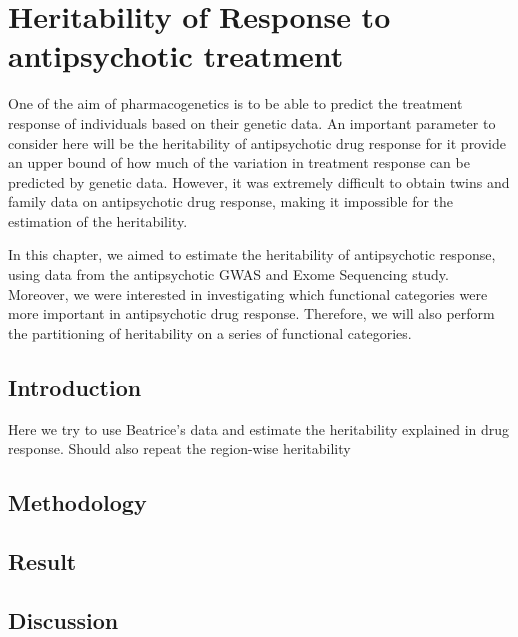 
	\chapter{Heritability of Response to antipsychotic treatment}
	One of the aim of pharmacogenetics is to be able to predict the treatment response of individuals based on their genetic data.
	An important parameter to consider here will be the heritability of antipsychotic drug response for it provide an upper bound of how much of the variation in treatment response can be predicted by genetic data. 
	However, it was extremely difficult to obtain twins and family data on antipsychotic drug response, making it impossible for the estimation of the heritability.
	
	In this chapter, we aimed to estimate the heritability of antipsychotic response, using data from the antipsychotic \gls{GWAS} and Exome Sequencing study. 
	Moreover, we were interested in investigating which functional categories were more important in antipsychotic drug response. 
	Therefore, we will also perform the partitioning of heritability on a series of functional categories.
	
	\section{Introduction}
	Here we try to use Beatrice's data and estimate the heritability explained in drug response.
	Should also repeat the region-wise heritability
	\section{Methodology}
	\section{Result}
	\section{Discussion}